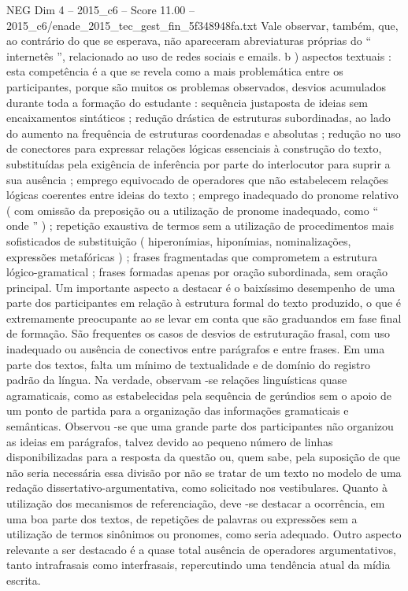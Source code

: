 \begin{textsample}{NEG Dim 4 – 2015\_c6 – Score 11.00 – 2015\_c6/enade\_2015\_tec\_gest\_fin\_5f348948fa.txt}
Vale observar, também, que, ao contrário do que se esperava, não apareceram abreviaturas próprias do “ internetês ”, relacionado ao uso de redes sociais e emails. b ) aspectos textuais : esta competência é a que se revela como a mais problemática entre os participantes, porque são muitos os problemas observados, desvios acumulados durante toda a formação do estudante : sequência justaposta de ideias sem encaixamentos sintáticos ; redução drástica de estruturas subordinadas, ao lado do aumento na frequência de estruturas coordenadas e absolutas ; redução no uso de conectores para expressar relações lógicas essenciais à construção do texto, substituídas pela exigência de inferência por parte do interlocutor para suprir a sua ausência ; emprego equivocado de operadores que não estabelecem relações lógicas coerentes entre ideias do texto ; emprego inadequado do pronome relativo ( com omissão da preposição ou a utilização de pronome inadequado, como “ onde ” ) ; repetição exaustiva de termos sem a utilização de procedimentos mais sofisticados de substituição ( hiperonímias, hiponímias, nominalizações, expressões metafóricas ) ; frases fragmentadas que comprometem a estrutura lógico-gramatical ; frases formadas apenas por oração subordinada, sem oração principal.
Um importante aspecto a destacar é o baixíssimo desempenho de uma parte dos participantes em relação à estrutura formal do texto produzido, o que é extremamente preocupante ao se levar em conta que são graduandos em fase final de formação.
São frequentes os casos de desvios de estruturação frasal, com uso inadequado ou ausência de conectivos entre parágrafos e entre frases.
Em uma parte dos textos, falta um mínimo de textualidade e de domínio do registro padrão da língua.
Na verdade, observam -se relações linguísticas quase agramaticais, como as estabelecidas pela sequência de gerúndios sem o apoio de um ponto de partida para a organização das informações gramaticais e semânticas.
Observou -se que uma grande parte dos participantes não organizou as ideias em parágrafos, talvez devido ao pequeno número de linhas disponibilizadas para a resposta da questão ou, quem sabe, pela suposição de que não seria necessária essa divisão por não se tratar de um texto no modelo de uma redação dissertativo-argumentativa, como solicitado nos vestibulares.
Quanto à utilização dos mecanismos de referenciação, deve -se destacar a ocorrência, em uma boa parte dos textos, de repetições de palavras ou expressões sem a utilização de termos sinônimos ou pronomes, como seria adequado.
Outro aspecto relevante a ser destacado é a quase total ausência de operadores argumentativos, tanto intrafrasais como interfrasais, repercutindo uma tendência atual da mídia escrita.

\end{textsample}
